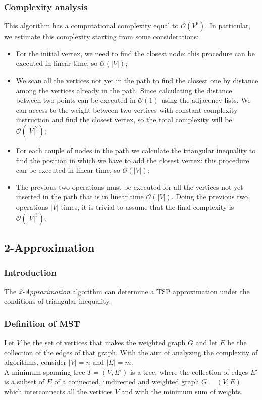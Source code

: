 \subsubsection{Complexity analysis}
This algorithm has a computational complexity equal to $\mathcal{O}(V^3)$. In particular, we estimate this complexity starting from some considerations:
\begin{itemize}
    \item For the initial vertex, we need to find the closest node: this procedure can be executed in linear time, so $\mathcal{O}(|V|)$;
    \item We scan all the vertices not yet in the path to find the closest one by distance among the vertices already in the path. Since calculating the distance between two points can be executed in $\mathcal{O}(1)$ using the adjacency lists. We can access to the weight between two vertices with constant complexity instruction and find the closest vertex, so the total complexity will be $\mathcal{O}(|V|^2)$;
    \item For each couple of nodes in the path we calculate the triangular inequality to find the position in which we have to add the closest vertex: this procedure can be executed in linear time, so $\mathcal{O}(|V|)$;
    \item The previous two operations must be executed for all the vertices not yet inserted in the path that is in linear time $\mathcal{O}(|V|)$. Doing the previous two operations $|V|$ times, it is trivial to assume that the final complexity is $\mathcal{O}(|V|^3)$. 
\end{itemize}

\subsection{2-Approximation}

\subsubsection{Introduction}
The \textit{2-Approximation} algorithm can determine a TSP approximation under the conditions of triangular inequality.

\subsubsection{Definition of MST}
Let $V$ be the set of vertices that makes the weighted graph $G$ and let $E$ be the collection of the edges of that graph. With the aim of analyzing the complexity of algorithms, consider $|V| = n$ and $|E| = m$. \\
A minimum spanning tree $T = (V,E')$ is a tree, where the collection of edges $E'$ is a subset of $E$ of a connected, undirected and weighted graph $G = (V,E)$ which interconnects all the vertices $V$ and with the minimum sum of weights. \\

